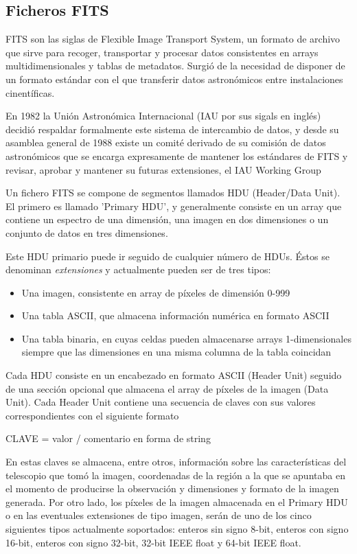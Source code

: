 \documentclass[a4paper,12pt]{article}
\begin{document}
\subsection{Ficheros FITS}
\label{sec:FITS}

FITS\cite{fits} son las siglas de Flexible Image Transport System, un formato de archivo que sirve para recoger, transportar y procesar datos consistentes en arrays multidimensionales y tablas de metadatos. Surgió de la necesidad de disponer de un formato estándar con el que transferir datos astronómicos entre instalaciones cinentíficas.

En 1982 la Unión Astronómica Internacional (IAU por sus sigals en inglés) decidió respaldar formalmente este sistema de intercambio de datos, y desde su asamblea general de 1988 existe un comité derivado de su comisión de datos astronómicos que se encarga expresamente de mantener los estándares de FITS y revisar, aprobar y mantener su futuras extensiones, el IAU Working Group 

Un fichero FITS se compone de segmentos llamados HDU (Header/Data Unit). El primero es llamado 'Primary HDU', y generalmente consiste en un array que contiene un espectro de una dimensión, una imagen en dos dimensiones o un conjunto de datos en tres dimensiones.

Este HDU primario puede ir seguido de cualquier número de HDUs. Éstos se denominan \textit{extensiones} y actualmente pueden ser de tres tipos:
\begin{itemize}
\item Una imagen, consistente en array de píxeles de dimensión 0-999
\item Una tabla ASCII, que almacena información numérica en formato ASCII
\item Una tabla binaria, en cuyas celdas pueden almacenarse arrays 1-dimensionales siempre que las dimensiones en una misma columna de la tabla coincidan
\end{itemize}
Cada HDU consiste en un encabezado en formato ASCII (Header Unit) seguido de una sección opcional que almacena el array de píxeles de la imagen (Data Unit). Cada Header Unit contiene una secuencia de claves con sus valores correspondientes con el siguiente formato
\begin{center}
CLAVE = valor / comentario en forma de string
\end{center}
En estas claves se almacena, entre otros, información sobre las características del telescopio que tomó la imagen, coordenadas de la región a la que se apuntaba en el momento de producirse la observación y dimensiones y formato de la imagen generada.
Por otro lado, los píxeles de la imagen almacenada en el Primary HDU o en las eventuales extensiones de tipo imagen, serán de uno de los cinco siguientes tipos actualmente soportados: enteros sin signo 8-bit, enteros con signo 16-bit, enteros con signo 32-bit, 32-bit IEEE float y 64-bit IEEE float.
\end{document}

